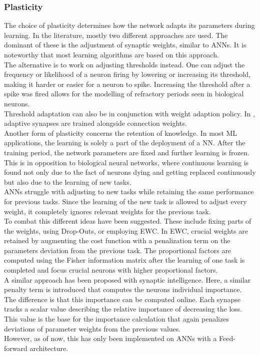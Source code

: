 \subsubsection{Plasticity}\label{sssec:plasticity}
	The choice of plasticity determines how the network adapts its parameters during learning. In the literature, mostly two different approaches are used. The dominant of these is the adjustment of synaptic weights, similar to \acp{ANN}. It is noteworthy that most learning algorithms are based on this approach.\\
	The alternative is to work on adjusting thresholds instead\cite{chen_adaptive_2022,amin_automated_2021}. One can adjust the frequency or likelihood of a neuron firing by lowering or increasing its threshold, making it harder or easier for a neuron to spike. Increasing the threshold after a spike was fired allows for the modelling of refractory periods seen in biological neurons.\\
	Threshold adaptation can also be in conjunction with weight adaption policy. In \cite{sun_synapse-threshold_2023}, adaptive synapses are trained alongside connection weights.\\
	Another form of plasticity concerns the retention of knowledge. In most \ac{ML} applications, the learning is solely a part of the deployment of a \ac{NN}. After the training period, the network parameters are fixed and further learning is frozen. This is in opposition to biological neural networks, where continuous learning is found not only due to the fact of neurons dying and getting replaced continuously but also due to the learning of new tasks.\\
	\acp{ANN} struggle with adjusting to new tasks while retaining the same performance for previous tasks. Since the learning of the new task is allowed to adjust every weight, it completely ignores relevant weights for the previous task.\\
	To combat this different ideas have been suggested. These include fixing parts of the weights, using Drop-Outs, or employing \ac{EWC}\cite{kirkpatrick_overcoming_2017}. In \ac{EWC}, crucial weights are retained by augmenting the cost function with a penalization term on the parameters deviation from the previous task. The proportional factors are computed using the Fisher information matrix after the learning of one task is completed and focus crucial neurons with higher proportional factors.\\
	A similar approach has been proposed with synaptic intelligence\cite{zenke_continual_2017}.
	Here, a similar penalty term is introduced that computes the neurons individual importance. The difference is that this importance can be computed online. Each synapse tracks a scalar value describing the relative importance of decreasing the loss. This value is the base for the importance calculation that again penalizes deviations of parameter weights from the previous values.\\
	However, as of now, this has only been implemented on \acp{ANN} with a Feed-forward architecture.

